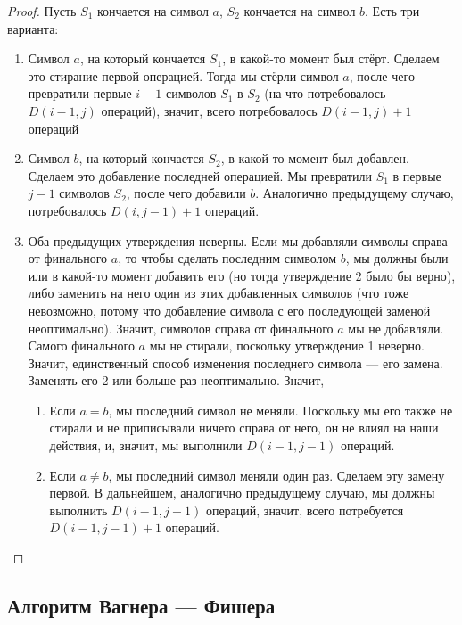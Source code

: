 \begin{proof}
    Пусть $S_1$ кончается на символ $a$, $S_2$ кончается на символ $b$.
    Есть три варианта:
    \begin{enumerate}
        \item Символ $a$, на который кончается $S_1$, в какой-то момент был стёрт.
        Сделаем это стирание первой операцией.
        Тогда мы стёрли символ $a$, после чего превратили первые $i - 1$ символов $S_1$ в $S_2$ (на что потребовалось $D(i-1, j)$ операций), значит, всего потребовалось $D(i-1, j)+1$ операций
        \item Символ $b$, на который кончается $S_2$, в какой-то момент был добавлен.
        Сделаем это добавление последней операцией.
        Мы превратили $S_1$ в первые $j-1$ символов $S_2$, после чего добавили $b$.
        Аналогично предыдущему случаю, потребовалось $D(i, j-1)+1$ операций.
        \item Оба предыдущих утверждения неверны.
        Если мы добавляли символы справа от финального $a$, то чтобы сделать последним символом $b$, мы должны были или в какой-то момент добавить его (но тогда утверждение 2 было бы верно), либо заменить на него один из этих добавленных символов (что тоже невозможно, потому что добавление символа с его последующей заменой неоптимально).
        Значит, символов справа от финального $a$ мы не добавляли.
        Самого финального $a$ мы не стирали, поскольку утверждение 1 неверно.
        Значит, единственный способ изменения последнего символа --- его замена.
        Заменять его 2 или больше раз неоптимально.
        Значит,
        \begin{enumerate}
            \item Если $a=b$, мы последний символ не меняли.
            Поскольку мы его также не стирали и не приписывали ничего справа от него, он не влиял на наши действия, и, значит, мы выполнили $D(i-1, j-1)$ операций.
            \item Если $a \not= b$, мы последний символ меняли один раз.
            Сделаем эту замену первой.
            В дальнейшем, аналогично предыдущему случаю, мы должны выполнить $D(i-1, j-1)$ операций, значит, всего потребуется $D(i-1, j-1)+1$ операций.
        \end{enumerate}
    \end{enumerate}
\end{proof}

\subsection{Алгоритм Вагнера --- Фишера}

